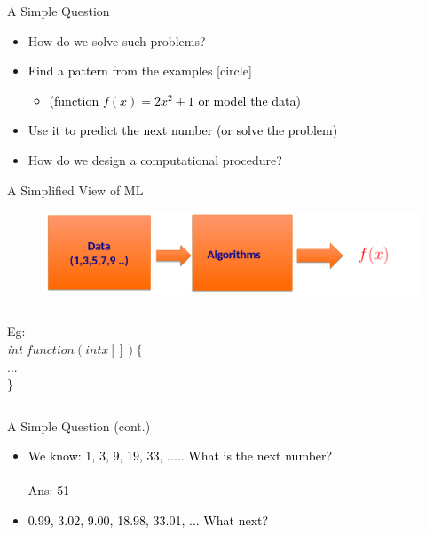 \documentclass[aspectratio=169,14pt]{beamer}
\begin{document}
\begin{frame}{A Simple Question}
\begin{itemize}
\item<2-> \alert{How do we solve such problems?}
\end{itemize}
\begin{itemize}
\item<3-> \textcolor{black}{Find a pattern from the examples}
[circle]
  \begin{itemize}
  \item<3-> \textcolor{black}{(function \alert{$f(x)=2x^2+1$} or model the data)}
\end{itemize}
\end{itemize}
\begin{itemize}
\item<4-> \textcolor{black}{Use it to predict the next number (or solve the  problem)}
\item<5-> \alert{How do we design a computational procedure?}
\end{itemize}
\end{frame}


\begin{frame}{A Simplified View of ML}
\begin{figure}
\includegraphics[width=\textwidth,height=0.35\textheight]{Images/demystifying_algorithms.png}
\end{figure}
	\begin{columns}
	Eg: 
		\\\textsl{int} $function(int x[]) \{ $ \\
	... \\
	\}
	
	\end{columns}
\end{frame}

\begin{frame}{A Simple Question (cont.)}
\begin{itemize}
	\item<2-> \textcolor{black}{We know: 1, 3, 9, 19, 33, ..... What is the next number?\\ \textcolor{white}{.\\} Ans: 51 \vspace{25pt}}     \only<3->{\alert{$2x^2+1$}}
\item<4-> \textcolor{black}{ 0.99, 3.02, 9.00, 18.98, 33.01, ... What next?} 
\end{itemize}
\end{frame}
\end{document}

